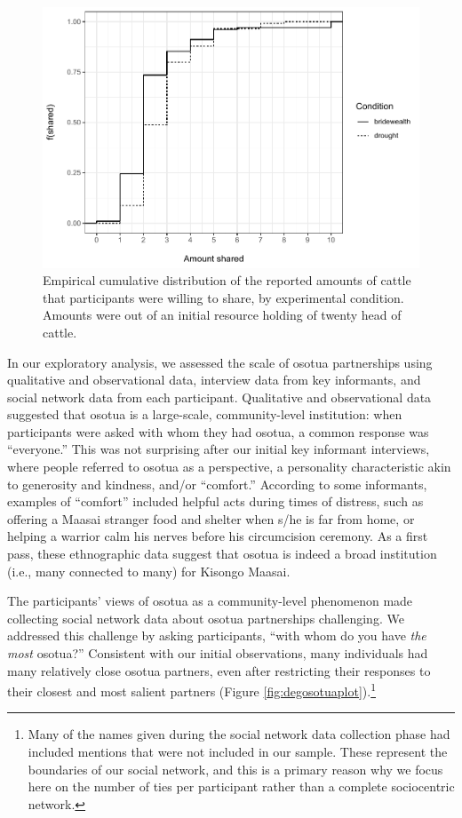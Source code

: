 \documentclass[
]{article}
\begin{document}
\begin{figure}
\centering
\includegraphics{needBasedSharing-paper_files/figure-latex/amtshareplot-1.pdf}
\caption{\label{fig:amtshareplot}Empirical cumulative distribution of the reported amounts of cattle that participants were willing to share, by experimental condition. Amounts were out of an initial resource holding of twenty head of cattle.}
\end{figure}

In our exploratory analysis, we assessed the scale of osotua partnerships using qualitative and observational data, interview data from key informants, and social network data from each participant. Qualitative and observational data suggested that osotua is a large-scale, community-level institution: when participants were asked with whom they had osotua, a common response was ``everyone.'' This was not surprising after our initial key informant interviews, where people referred to osotua as a perspective, a personality characteristic akin to generosity and kindness, and/or ``comfort.'' According to some informants, examples of ``comfort'' included helpful acts during times of distress, such as offering a Maasai stranger food and shelter when s/he is far from home, or helping a warrior calm his nerves before his circumcision ceremony. As a first pass, these ethnographic data suggest that osotua is indeed a broad institution (i.e., many connected to many) for Kisongo Maasai.

The participants' views of osotua as a community-level phenomenon made collecting social network data about osotua partnerships challenging. We addressed this challenge by asking participants, ``with whom do you have \emph{the most} osotua?'' Consistent with our initial observations, many individuals had many relatively close osotua partners, even after restricting their responses to their closest and most salient partners (Figure \ref{fig:degosotuaplot}).\footnote{Many of the names given during the social network data collection phase had included mentions that were not included in our sample. These represent the boundaries of our social network, and this is a primary reason why we focus here on the number of ties per participant rather than a complete sociocentric network.}
\end{document}
